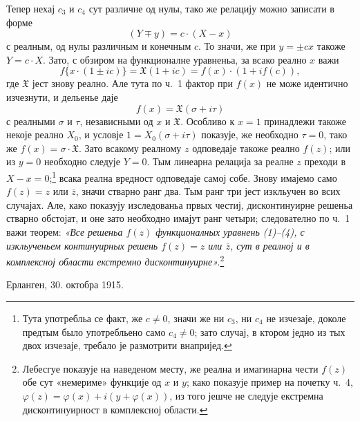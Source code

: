 ﻿\documentclass[11pt]{article}
\providecommand{\Xreal}{\mathfrak X}
\begin{document}
Тепер нехај \(c_3\) и \(c_4\) сут различне од нулы, тако же релацију можно записати в форме
\[
(Y\mp y)=c\cdot(X-x)
\]
с реалным, од нулы различным и конечным \(c\). То значи, же при \(y=\pm cx\) такоже \(Y=c\cdot X\). Зато, с обзиром на функционалне уравненьа, за всако реално \(x\) важи
\[
f\{x\cdot(1\pm ic)\}=\Xreal(1+ic)=f(x)\cdot(1+i f(c)),
\]
где \(\Xreal\) јест знову реално. Але тута по ч.~1 фактор при \(f(x)\) не може идентично изчезнути, и дельенье даје
\[
f(x)=\Xreal(\sigma+i\tau)
\]
с реалными \(\sigma\) и \(\tau\), независными од \(x\) и \(\Xreal\). Особливо к \(x=1\) принадлежи такоже некоје реално \(X_0\), и условје \(1=X_0(\sigma+i\tau)\) показује, же необходно \(\tau=0\), тако же \(f(x)=\sigma\cdot\Xreal\). Зато всакому реалному \(z\) одповедаје такоже реално \(f(z)\); или из \(y=0\) необходно следује \(Y=0\). Тым линеарна релација за реалне \(z\) преходи в \(X-x=0\);\footnote{Тута употребльа се факт, же \(c\ne0\), значи же ни \(c_3\), ни \(c_4\) не изчезаје, доколе предтым было употребльено само \(c_4\ne0\); зато случај, в ктором једно из тых двох изчезаје, требало је размотрити внапријед.} всака реална вредност одповедаје самој собе. Знову имајемо само \(f(z)=z\) или \(\overline z\), значи стварно ранг два. Тым ранг три јест изкльучен во всих случајах. Але, како показују изследованьа првых честиј, дисконтинуирне решеньа стварно обстојат, и оне зато необходно имајут ранг четыри; следователно по ч.~1 важи теорем: {\itshape «Все решеньа \(f(z)\) функционалных уравнень (1)--(4), с изкльученьем континуирных решень \(f(z)=z\) или \(\overline z\), сут в реалној и в комплексној области екстремно дисконтинуирне».}\footnote{Лебесгуе показује на наведеном месту, же реална и имагинарна чести \(f(z)\) обе сут «немериме» функције од \(x\) и \(y\); како показује пример на почетку ч.~4, \(\varphi(z)=\varphi(x)+i(y+\varphi(x))\), из того јешче не следује екстремна дисконтинуирност в комплексној области.}

\medskip
\noindent Ерланген, 30. октобра 1915.
\end{document}
